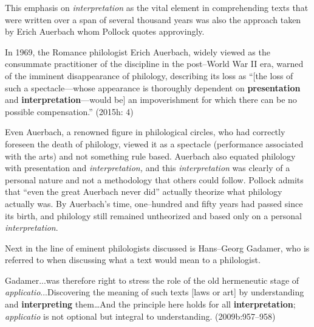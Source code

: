 This emphasis on \textit{interpretation} as the vital element in comprehending texts that were written over a span of several thousand years was also the approach taken by Erich Auerbach whom Pollock quotes approvingly.

\begin{myquote}
In 1969, the Romance philologist Erich Auerbach, widely viewed as the consummate practitioner of the discipline in the post–World War II era, warned of the imminent disappearance of philology, describing its loss as “[the loss of such a spectacle—whose appearance is thoroughly dependent on \textbf{presentation} and \textbf{interpretation}—would be] an impoverishment for which there can be no possible compensation.” (2015h: 4)
\end{myquote}

Even Auerbach, a renowned figure in philological circles, who had correctly foreseen the death of philology, viewed it as a spectacle (performance associated with the arts) and not something rule based. Auerbach also equated philology with presentation and \textit{interpretation,} and this \textit{interpretation} was clearly of a personal nature and not a methodology that others could follow. Pollock admits that “even the great Auerbach never did” actually theorize what philology actually was. By Auerbach’s time, one–hundred and fifty years had passed since its birth, and philology still remained untheorized and based only on a personal \textit{interpretation}.

\newpage

Next in the line of eminent philologists discussed is Hans–Georg Gadamer, who is referred to when discussing what a text would mean to a philologist.

\begin{myquote}
Gadamer...was therefore right to stress the role of the old hermeneutic stage of \textit{applicatio}...Discovering the meaning of such texts [laws or art] by understanding and \textbf{interpreting} them…And the principle here holds for all \textbf{interpretation}; \textit{applicatio} is not optional but integral to understanding. (2009b:957–958)
\end{myquote}

